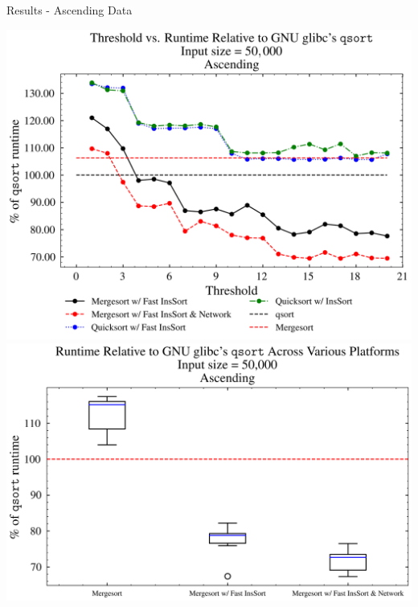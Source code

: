 \documentclass[13pt]{beamer}
\begin{document}
\begin{frame}{Results - Ascending Data}
	\begin{multicols}{2}
		\includegraphics[width=\columnwidth]{../figures/ascending.png}
		\includegraphics[width=\columnwidth]{../figures/boxplots/2.gen.png}
	\end{multicols}
\end{frame}
\end{document}
